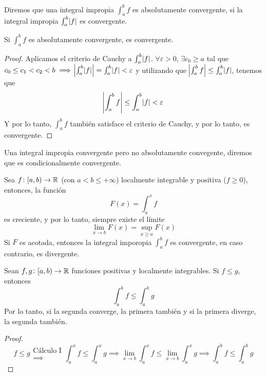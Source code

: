 \begin{defi}
	Diremos que una integral impropia $\int^b_a f$ es absolutamente convergente,
	si la integral impropia $\int^b_a \abs{f}$ es convergente.
\end{defi}

\begin{prop}
	Si $\int^b_a f$ es absolutamente convergente, es convergente.
\end{prop}
\begin{proof}
	Aplicamos el criterio de Cauchy a $\int^b_a \abs{f}$. $\forall \varepsilon >0$,
	$\exists  c_0 \geq a$ tal que $c_0 \leq c_1 < c_2 < b \implies
	\abs{\int^b_a \abs{f}} = \int^b_a \abs{f} < \varepsilon$ y utilizando que 
	$\abs{\int^b_a f} \leq \int^b_a \abs{f}$, tenemos que
	\[
		\abs{\int^b_a f} \leq \int^b_a \abs{f} < \varepsilon
	\]
	Y por lo tanto, $\int^b_a f$ tambi\'en satisface el criterio de Cauchy, y por
	lo tanto, es convergente.
\end{proof}

\begin{defi}
	Una integral impropia convergente pero no absolutamente convegente, diremos que
	es condicionalmente convergente.
\end{defi}

\begin{prop}
	Sea $f \colon [a,b) \to \mathbb{R}$ (con $a < b \leq +\infty$) localmente integrable
	y positiva ($f \geq 0$), entonces, la función
	\[
		F(x) = \int^x_a f
	\]
	es creciente, y por lo tanto, siempre existe el límite
	\[
		\lim_{x \to b} F(x) = \sup_{x \geq a} F(x)
	\]
	Si $F$ es acotada, entonces la integral imporopia $\int^b_a f$ es convergente,
	en caso contrario, es divergente.
\end{prop}

\begin{prop}%
	Sean $f,g \colon [a,b) \to \mathbb{R}$ funciones positivas y localmente integrables.
	Si $f \leq g$, entonces
	\[
		\int^b_a f \leq \int^b_a g
	\]
	Por lo tanto, si la segunda converge, la primera tambi\'en y si la primera 
	diverge, la segunda tambi\'en.
\end{prop}
\begin{proof}
	\[
		f \leq g \substack{\text{Cálculo I} \\ \implies}
		\int^x_a f \leq \int^x_a g \implies \lim_{x \to b} \int^x_a f \leq
		\lim_{x \to b} \int^x_a g \implies \int^b_a f \leq \int^b_a g
	\]
\end{proof}

